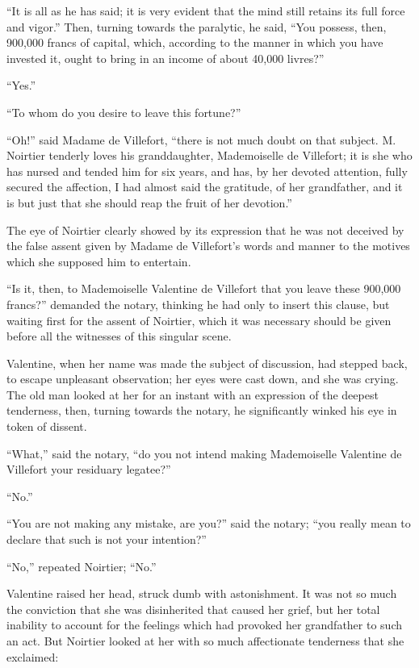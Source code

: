 “It is all as he has said; it is very evident that the mind still
retains its full force and vigor.” Then, turning towards the paralytic,
he said, “You possess, then, 900,000 francs of capital, which,
according to the manner in which you have invested it, ought to bring
in an income of about 40,000 livres?”

“Yes.”

“To whom do you desire to leave this fortune?”

“Oh!” said Madame de Villefort, “there is not much doubt on that
subject. M. Noirtier tenderly loves his granddaughter, Mademoiselle de
Villefort; it is she who has nursed and tended him for six years, and
has, by her devoted attention, fully secured the affection, I had
almost said the gratitude, of her grandfather, and it is but just that
she should reap the fruit of her devotion.”

The eye of Noirtier clearly showed by its expression that he was not
deceived by the false assent given by Madame de Villefort’s words and
manner to the motives which she supposed him to entertain.

“Is it, then, to Mademoiselle Valentine de Villefort that you leave
these 900,000 francs?” demanded the notary, thinking he had only to
insert this clause, but waiting first for the assent of Noirtier, which
it was necessary should be given before all the witnesses of this
singular scene.

Valentine, when her name was made the subject of discussion, had
stepped back, to escape unpleasant observation; her eyes were cast
down, and she was crying. The old man looked at her for an instant with
an expression of the deepest tenderness, then, turning towards the
notary, he significantly winked his eye in token of dissent.

“What,” said the notary, “do you not intend making Mademoiselle
Valentine de Villefort your residuary legatee?”

“No.”

“You are not making any mistake, are you?” said the notary; “you really
mean to declare that such is not your intention?”

“No,” repeated Noirtier; “No.”

Valentine raised her head, struck dumb with astonishment. It was not so
much the conviction that she was disinherited that caused her grief,
but her total inability to account for the feelings which had provoked
her grandfather to such an act. But Noirtier looked at her with so much
affectionate tenderness that she exclaimed:

